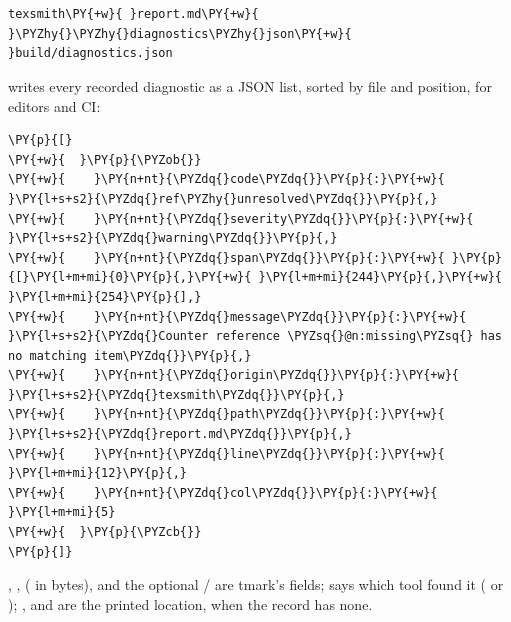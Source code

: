 \documentclass[a4paper,twoside]{article}
\begin{document}
\section{}
\begin{tscode}[lang=sh, engine=pygments]
\begin{Verbatim}[commandchars=\\\{\},breaklines, breakanywhere, commandchars=\\\{\}]
texsmith\PY{+w}{ }report.md\PY{+w}{ }\PYZhy{}\PYZhy{}diagnostics\PYZhy{}json\PY{+w}{ }build/diagnostics.json
\end{Verbatim}
\end{tscode}
writes every recorded diagnostic as a JSON list, sorted by file and position,
for editors and CI:
\begin{tscode}[lang=json, engine=pygments]
\begin{Verbatim}[commandchars=\\\{\},breaklines, breakanywhere, commandchars=\\\{\}]
\PY{p}{[}
\PY{+w}{  }\PY{p}{\PYZob{}}
\PY{+w}{    }\PY{n+nt}{\PYZdq{}code\PYZdq{}}\PY{p}{:}\PY{+w}{ }\PY{l+s+s2}{\PYZdq{}ref\PYZhy{}unresolved\PYZdq{}}\PY{p}{,}
\PY{+w}{    }\PY{n+nt}{\PYZdq{}severity\PYZdq{}}\PY{p}{:}\PY{+w}{ }\PY{l+s+s2}{\PYZdq{}warning\PYZdq{}}\PY{p}{,}
\PY{+w}{    }\PY{n+nt}{\PYZdq{}span\PYZdq{}}\PY{p}{:}\PY{+w}{ }\PY{p}{[}\PY{l+m+mi}{0}\PY{p}{,}\PY{+w}{ }\PY{l+m+mi}{244}\PY{p}{,}\PY{+w}{ }\PY{l+m+mi}{254}\PY{p}{],}
\PY{+w}{    }\PY{n+nt}{\PYZdq{}message\PYZdq{}}\PY{p}{:}\PY{+w}{ }\PY{l+s+s2}{\PYZdq{}Counter reference \PYZsq{}@n:missing\PYZsq{} has no matching item\PYZdq{}}\PY{p}{,}
\PY{+w}{    }\PY{n+nt}{\PYZdq{}origin\PYZdq{}}\PY{p}{:}\PY{+w}{ }\PY{l+s+s2}{\PYZdq{}texsmith\PYZdq{}}\PY{p}{,}
\PY{+w}{    }\PY{n+nt}{\PYZdq{}path\PYZdq{}}\PY{p}{:}\PY{+w}{ }\PY{l+s+s2}{\PYZdq{}report.md\PYZdq{}}\PY{p}{,}
\PY{+w}{    }\PY{n+nt}{\PYZdq{}line\PYZdq{}}\PY{p}{:}\PY{+w}{ }\PY{l+m+mi}{12}\PY{p}{,}
\PY{+w}{    }\PY{n+nt}{\PYZdq{}col\PYZdq{}}\PY{p}{:}\PY{+w}{ }\PY{l+m+mi}{5}
\PY{+w}{  }\PY{p}{\PYZcb{}}
\PY{p}{]}
\end{Verbatim}
\end{tscode}
, ,  ( in bytes),  and the
optional  /  are tmark's fields;  says which tool found
it ( or ); ,  and  are the printed location,
 when the record has none.
\end{document}
